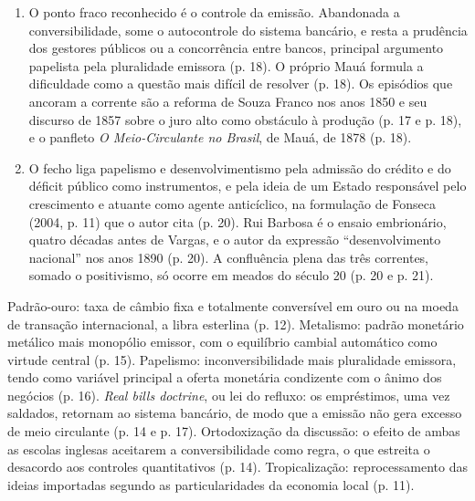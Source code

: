 \begin{enumerate}[leftmargin=*,nosep]
\item O ponto fraco reconhecido é o controle da emissão. Abandonada a
conversibilidade, some o autocontrole do sistema bancário, e resta a prudência
dos gestores públicos ou a concorrência entre bancos, principal argumento
papelista pela pluralidade emissora (p. 18). O próprio Mauá formula a
dificuldade como a questão mais difícil de resolver (p. 18). Os episódios que
ancoram a corrente são a reforma de Souza Franco nos anos 1850 e seu discurso
de 1857 sobre o juro alto como obstáculo à produção (p. 17 e p. 18), e o
panfleto \emph{O Meio-Circulante no Brasil}, de Mauá, de 1878 (p. 18).

\item O fecho liga papelismo e desenvolvimentismo pela admissão do crédito e do
déficit público como instrumentos, e pela ideia de um Estado responsável pelo
crescimento e atuante como agente anticíclico, na formulação de Fonseca (2004,
p. 11) que o autor cita (p. 20). Rui Barbosa é o ensaio embrionário, quatro
décadas antes de Vargas, e o autor da expressão ``desenvolvimento nacional''
nos anos 1890 (p. 20). A confluência plena das três correntes, somado o
positivismo, só ocorre em meados do século 20 (p. 20 e p. 21).
\end{enumerate}




Padrão-ouro: taxa de câmbio fixa e totalmente conversível em ouro ou na moeda
de transação internacional, a libra esterlina (p. 12). Metalismo: padrão
monetário metálico mais monopólio emissor, com o equilíbrio cambial automático
como virtude central (p. 15). Papelismo: inconversibilidade mais pluralidade
emissora, tendo como variável principal a oferta monetária condizente com o
ânimo dos negócios (p. 16). \emph{Real bills doctrine}, ou lei do refluxo: os
empréstimos, uma vez saldados, retornam ao sistema bancário, de modo que a
emissão não gera excesso de meio circulante (p. 14 e p. 17). Ortodoxização da
discussão: o efeito de ambas as escolas inglesas aceitarem a conversibilidade
como regra, o que estreita o desacordo aos controles quantitativos (p. 14).
Tropicalização: reprocessamento das ideias importadas segundo as
particularidades da economia local (p. 11).

